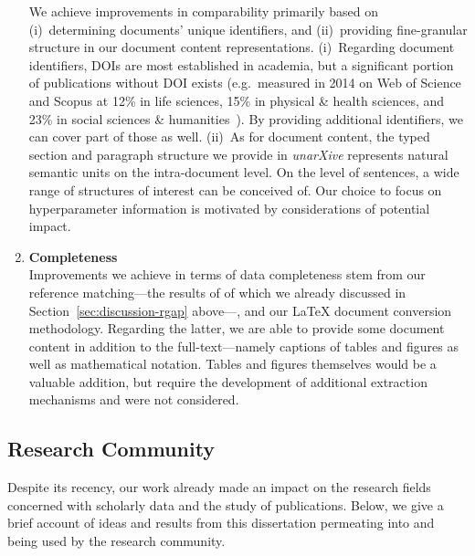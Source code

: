 \begin{enumerate}
We achieve improvements in comparability primarily based on (i)~determining documents' unique identifiers, and (ii)~providing fine-granular structure in our document content representations. (i)~Regarding document identifiers, DOIs are most established in academia, but a significant portion of publications without DOI exists (e.g.\ measured in 2014 on Web of Science and Scopus at 12\% in life sciences, 15\% in physical \& health sciences, and 23\% in social sciences \& humanities~\cite{Gorraiz2016}). %
By providing additional identifiers, we can cover part of those as well. (ii)~As for document content, the typed section and paragraph structure we provide in \textit{unarXive} represents natural semantic units on the intra-document level. On the level of sentences, a wide range of structures of interest can be conceived of. Our choice to focus on hyperparameter information is motivated by considerations of potential impact.
\item \textbf{Completeness}\\
Improvements we achieve in terms of data completeness stem from our reference matching---the results of of which we already discussed in Section~\ref{sec:discussion-rgap} above---, and our \LaTeX{} document conversion methodology. Regarding the latter, we are able to provide some document content in addition to the full-text---namely captions of tables and figures as well as mathematical notation. Tables and figures themselves would be a valuable addition, but require the development of additional extraction mechanisms and were not considered. %
\end{enumerate}

\subsection{Research Community}
Despite its recency, our work already made an impact on the research fields concerned with scholarly data and the study of publications. Below, we give a brief account of ideas and results from this dissertation permeating into and being used by the research community.

